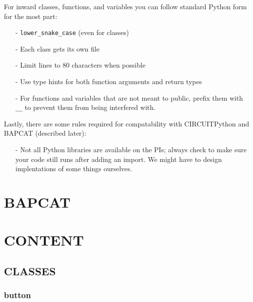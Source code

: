 \documentclass[12pt]{scrartcl} %
\begin{document}
For inward classes, functions, and variables you can follow standard Python
form for the most part:

\begin{itemize}
  \item[-] \texttt{lower_snake_case} (even for classes)
  \item[-] Each class gets its own file
  \item[-] Limit lines to 80 characters when possible
  \item[-] Use type hints for both function arguments and return types
  \item[-] For functions and variables that are not meant to public, prefix
    them with \texttt{__} to prevent them from being interfered
    with.
\end{itemize}

Lastly, there are some rules required for compatability with CIRCUITPython and
BAPCAT (described later):

\begin{itemize}
  \item[-] Not all Python libraries are available on the PIs; always check to
    make sure your code still runs after adding an import. We might have to
    design implentations of some things ourselves.
\end{itemize}

\newpage

\section{BAPCAT}

\newpage

\section{CONTENT}

\subsection{CLASSES}

\subsubsection{button}
\end{document}
